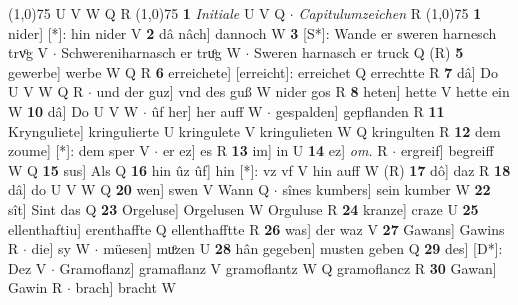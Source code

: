 \documentclass[8pt,a4paper,notitlepage]{article}
\begin{document}
\begin{table}[ht]
\begin{minipage}[t]{0.5\linewidth}
\line(1,0){75} \newline
U V W Q R \newline
\line(1,0){75} \newline
\textbf{1} \textit{Initiale} U V Q   $\cdot$ \textit{Capitulumzeichen} R  \newline
\line(1,0){75} \newline
\textbf{1} nider] [*]: hin nider V \textbf{2} dâ nâch] dannoch W \textbf{3} [S*]: Wande er sweren harnesch trvͦg V  $\cdot$ Schwereniharnasch er truͦg W  $\cdot$ Sweren harnasch er truck Q (R) \textbf{5} gewerbe] werbe W Q R \textbf{6} erreichete] [erreicht]:  erreichet Q errechtte R \textbf{7} dâ] Do U V W Q R  $\cdot$ und der guz] vnd des guß W nider gos R \textbf{8} heten] hette V hette ein W \textbf{10} dâ] Do U V W  $\cdot$ ûf her] her auff W  $\cdot$ gespalden] gepflanden R \textbf{11} Krynguliete] kringulierte U kringulete V kringulieten W Q kringulten R \textbf{12} dem zoume] [*]: dem sper V  $\cdot$ er ez] es R \textbf{13} im] in U \textbf{14} ez] \textit{om.} R  $\cdot$ ergreif] begreiff W Q \textbf{15} sus] Als Q \textbf{16} hin ûz ûf] hin [*]: vz vf V hin auff W (R) \textbf{17} dô] daz R \textbf{18} dâ] do U V W Q \textbf{20} wen] swen V Wann Q  $\cdot$ sînes kumbers] sein kumber W \textbf{22} sît] Sint das Q \textbf{23} Orgeluse] Orgelusen W Orguluse R \textbf{24} kranze] craze U \textbf{25} ellenthaftiu] erenthaffte Q ellenthafftte R \textbf{26} was] der waz V \textbf{27} Gawans] Gawins R  $\cdot$ die] sy W  $\cdot$ müesen] muͦzen U \textbf{28} hân gegeben] musten geben Q \textbf{29} des] [D*]: Dez V  $\cdot$ Gramoflanz] gramaflanz V gramoflantz W Q gramoflancz R \textbf{30} Gawan] Gawin R  $\cdot$ brach] bracht W \newline
\end{minipage}
\end{table}
\end{document}
